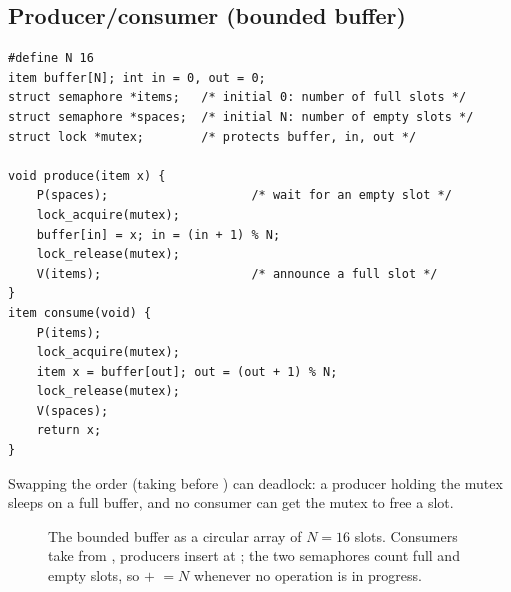 \subsection{Producer/consumer (bounded buffer)}
\begin{lstlisting}[style=c]
#define N 16
item buffer[N]; int in = 0, out = 0;
struct semaphore *items;   /* initial 0: number of full slots */
struct semaphore *spaces;  /* initial N: number of empty slots */
struct lock *mutex;        /* protects buffer, in, out */

void produce(item x) {
    P(spaces);                    /* wait for an empty slot */
    lock_acquire(mutex);
    buffer[in] = x; in = (in + 1) % N;
    lock_release(mutex);
    V(items);                     /* announce a full slot */
}
item consume(void) {
    P(items);
    lock_acquire(mutex);
    item x = buffer[out]; out = (out + 1) % N;
    lock_release(mutex);
    V(spaces);
    return x;
}
\end{lstlisting}
\begin{remark}
Swapping the order (taking  before ) can deadlock: a producer holding
the mutex sleeps on a full buffer, and no consumer can get the mutex to free a slot.
\end{remark}

\begin{figure}[H]
\centering
{}
\caption{The bounded buffer as a circular array of $N=16$ slots. Consumers
take from , producers insert at ; the two semaphores
count full and empty slots, so  $+$  $=N$ whenever
no operation is in progress.}
\end{figure}

